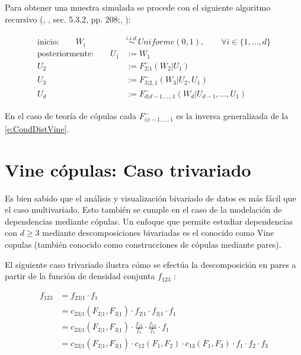 Para obtener una muestra simulada se procede con el siguiente algoritmo recursivo (\citeauthor{mai_simulating_2012}, \citeyear{mai_simulating_2012}, sec. 5.3.2, pp. 208;\citeauthor{dismann_statistical_2010}, \citeyear{dismann_statistical_2010}):

\begin{align}
	\text{inicio:} \qquad  W_{i} & \overset{i.i.d.}{\sim} Uniforme(0,1), \qquad \forall i \in \{1, \ldots, d\} \\
	\text{posteriormente:} \qquad U_{1} &:= W_{1} \\
U_{2} &:= F_{2|1}^{-}(W_{2}|U_{1}) \\
U_{3} &:= F_{3|2,1}^{-}(W_{3}|U_{2}, U_{1}) \\
U_{d} &:= F_{d|d - 1, \ldots, 1}^{-}(W_{d}|U_{d-1}, \ldots, U_{1})
\label{e:CopSimAlg_multi}
\end{align}

En el caso de teor\'ia de c\'opulas cada $F^{-}_{i|i-1,\ldots,1}$ es la inversa generalizada de la \autoref{e:CondDistVine}.

\section{Vine c\'{o}pulas: Caso trivariado}

Es bien sabido que el an\'{a}lisis y visualizaci\'{o}n bivariado de datos es m\'{a}s f\'{a}cil que el caso multivariado. Esto tambi\'en se cumple en el caso de la modelaci\'{o}n de dependencias mediante c\'{o}pulas. Un enfoque que permite estudiar dependencias con $d \ge 3$ mediante descomposiciones bivariadas es el conocido como Vine copulas (tambi\'en conocido como construcciones de c\'{o}pulas mediante pares).

El siguiente caso trivariado ilustra c\'{o}mo se efect\'{u}a la descomposici\'{o}n en pares a partir de la funci\'{o}n de densidad conjunta $f_{123}$ \citep{diaz2015vine}:

\begin{align}
f_{123} &= f_{23|1} \cdot f_1 \\
 &=c_{23|1} (F_{2|1}, F_{3|1}) \cdot f_{2|1} \cdot f_{3|1} \cdot f_1 \\
 &=c_{23|1} (F_{2|1}, F_{3|1}) \cdot \frac{f_{12}}{f_1} \cdot \frac{f_{13}}{f_1} \cdot f_1 \\
 &=c_{23|1} (F_{2|1}, F_{3|1}) \cdot c_{12}(F_1, F_2) \cdot c_{13}(F_1, F_3) \cdot f_1 \cdot f_2 \cdot f_3
\label{e:vine3}
\end{align}


